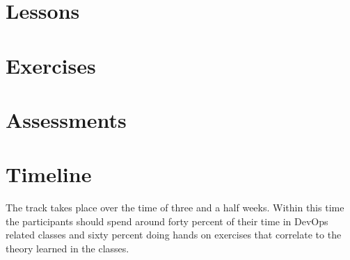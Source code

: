 \documentclass{article}
\begin{document}
\section{Lessons}

\section{Exercises}

\section{Assessments}

\section{Timeline}

The track takes place over the time of three and a half weeks. Within this time
the participants should spend around forty percent of their time in DevOps
related classes and sixty percent doing hands on exercises that correlate to the
theory learned in the classes.
\end{document}
